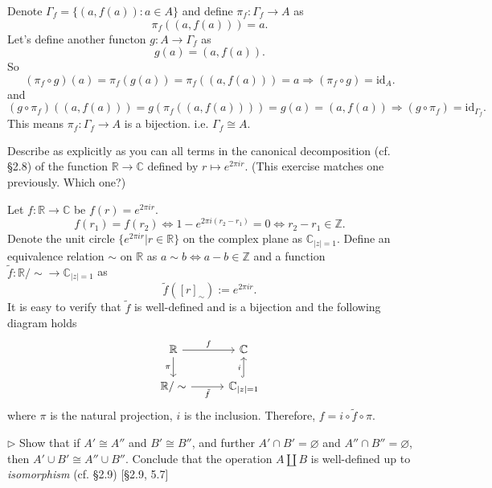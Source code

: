 \begin{solution}
Denote $\Gamma_f = \{(a, f(a)): a\in A\}$ and define $\pi_f: \Gamma_f \rightarrow A$ as 
$$\pi_f((a,f(a))) = a.$$
Let's define another functon $g: A\rightarrow \Gamma_f$ as $$g(a) = (a,f(a)).$$
So
$$(\pi_f\circ g)(a) = \pi_f(g(a)) = \pi_f((a,f(a)))=a \Rightarrow (\pi_f\circ g) = \text{id}_{A}.$$
and
$$(g\circ \pi_f)((a,f(a))) = g(\pi_f((a,f(a))))=g(a)=(a,f(a))\Rightarrow (g\circ \pi_f) = \text{id}_{\Gamma_f}.$$
This means $\pi_f: \Gamma_f\rightarrow A$ is a bijection. i.e. $\Gamma_f\cong A$.
\end{solution}

\begin{problem}[2.8]
  Describe as explicitly as you can all terms in the canonical decomposition (cf.
  \S2.8) of the function $\mathbb{R}\to\mathbb{C}$ defined by $r\mapsto e^{2\pi
    ir}$. (This exercise matches one previously. Which one?)
\end{problem}

\begin{solution}
Let $f: \mathbb{R}\to\mathbb{C}$ be $f(r) = e^{2\pi ir}$. 
$$f(r_1) = f(r_2) \iff 1-e^{2\pi i(r_2-r_1)} = 0 \iff r_2-r_1\in\mathbb{Z}.$$
Denote the unit circle $\{e^{2\pi i r} | r\in\mathbb{R}\}$ on the complex plane as $\mathbb{C}_{|z|=1}$.
Define an equivalence relation $\sim$ on $\mathbb{R}$ as $a\sim b \iff a-b\in\mathbb{Z}$ and 
a function $\tilde{f}: \mathbb{R}/\sim\rightarrow \mathbb{C}_{|z|=1}$ as
$$\tilde{f}([r]_{\sim}) := e^{2\pi i r}.$$
It is easy to verify that $\tilde{f}$ is well-defined and is a bijection and the following diagram holds
\[ 
\begin{tikzcd}
\mathbb{R} \arrow[r, "f"] \arrow[d, "\pi"'] &[0.5em]  \mathbb{C}  \\
 \mathbb{R}/\sim \arrow[r, "\tilde{f}"'] & \mathbb{C}_{|z|=1} \arrow[hookrightarrow,u, "i"] 
\end{tikzcd}
\]
where $\pi$ is the natural projection, $\textit{i}$ is the inclusion. Therefore, $f=\textit{i}\circ\tilde{f}\circ\pi$.
\end{solution}


\hypertarget{Exercise I.2.9}{}
\begin{problem}[2.9]
  $\rhd$ Show that if $A'\cong A''$ and $B'\cong B''$, and further
  $A'\cap B'=\varnothing$ and $A''\cap B''=\varnothing$, then $A'\cup B'\cong A''\cup
  B''$. Conclude that the operation $A\amalg B$ is well-defined up to
  \textit{isomorphism} (cf. \S2.9) [\S2.9, 5.7]
\end{problem}


